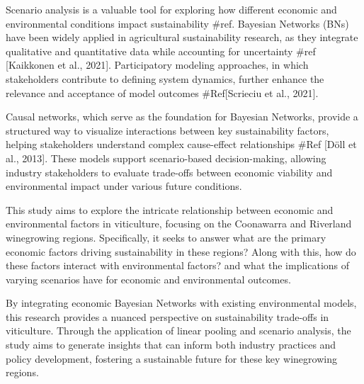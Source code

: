\documentclass{article}
\begin{document}
Scenario analysis is a valuable tool for exploring how different economic and environmental conditions impact sustainability #ref. Bayesian Networks (BNs) have been widely applied in agricultural sustainability research, as they integrate qualitative and quantitative data while accounting for uncertainty #ref [Kaikkonen et al., 2021]. Participatory modeling approaches, in which stakeholders contribute to defining system dynamics, further enhance the relevance and acceptance of model outcomes #Ref[Scrieciu et al., 2021].

Causal networks, which serve as the foundation for Bayesian Networks, provide a structured way to visualize interactions between key sustainability factors, helping stakeholders understand complex cause-effect relationships #Ref [Döll et al., 2013]. These models support scenario-based decision-making, allowing industry stakeholders to evaluate trade-offs between economic viability and environmental impact under various future conditions.

This study aims to explore the intricate relationship between economic and environmental factors in viticulture, focusing on the Coonawarra and Riverland winegrowing regions. Specifically, it seeks to answer what are the primary economic factors driving sustainability in these regions? Along with this, how do these factors interact with environmental factors? and what the implications of varying scenarios have for economic and environmental outcomes.

By integrating economic Bayesian Networks with existing environmental models, this research provides a nuanced perspective on sustainability trade-offs in viticulture. Through the application of linear pooling and scenario analysis, the study aims to generate insights that can inform both industry practices and policy development, fostering a sustainable future for these key winegrowing regions.

\end{document}
